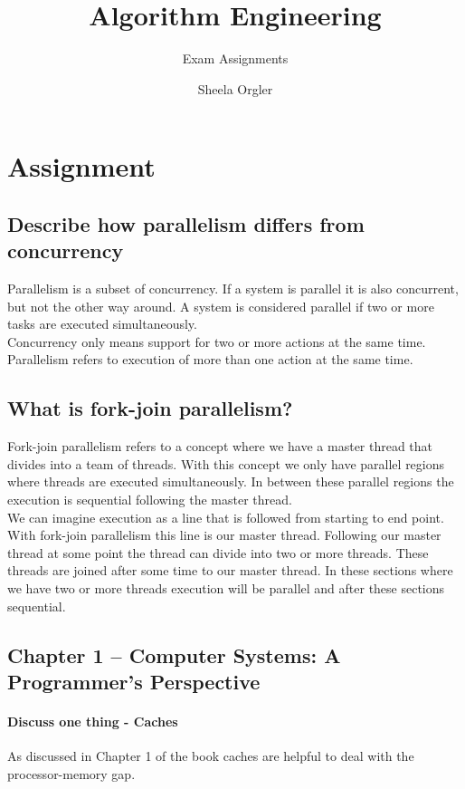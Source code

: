 \documentclass[runningheads]{llncs}
\begin{document}
\title{Algorithm Engineering}
\subtitle{Exam Assignments}


\author{Sheela Orgler}

\maketitle


\section{Assignment}

\subsection{Describe how parallelism differs from concurrency}
Parallelism is a subset of concurrency. If a system is parallel it is also concurrent, but not the other way around. A system is considered parallel if two or more tasks are executed simultaneously.
\\
Concurrency only means support for two or more actions at the same time. Parallelism refers to execution of more than one action at the same time.

\subsection{What is fork-join parallelism?}
Fork-join parallelism refers to a concept where we have a master thread that divides into a team of threads. With this concept we only have parallel regions where threads are executed simultaneously. In between these parallel regions the execution is sequential following the master thread. 
\\
We can imagine execution as a line that is followed from starting to end point. With fork-join parallelism this line is our master thread. Following our master thread at some point the thread can divide into two or more threads. These threads are joined after some time to our master thread. In these sections where we have two or more threads execution will be parallel and after these sections sequential. 


\subsection {Chapter 1 – Computer Systems: A Programmer’s Perspective}

\paragraph{Discuss one thing - Caches}
As discussed in Chapter 1 of the book caches are helpful to deal with the processor-memory gap. 
\end{document}
